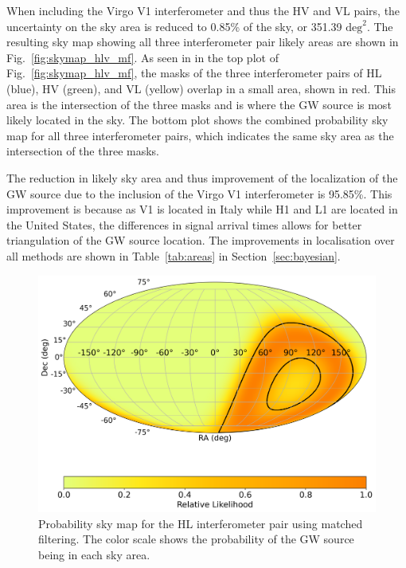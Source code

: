 \documentclass[11pt,a4paper]{article}
\begin{document}
When including the Virgo V1 interferometer and thus the HV and VL pairs, the uncertainty on the sky area is reduced to 0.85\% of the sky, or 351.39 $\mathrm{deg}^2$. The resulting sky map showing all three interferometer pair likely areas are shown in Fig.~\ref{fig:skymap_hlv_mf}. As seen in in the top plot of Fig.~\ref{fig:skymap_hlv_mf}, the masks of the three interferometer pairs of HL (blue), HV (green), and VL (yellow) overlap in a small area, shown in red. This area is the intersection of the three masks and is where the GW source is most likely located in the sky. The bottom plot shows the combined probability sky map for all three interferometer pairs, which indicates the same sky area as the intersection of the three masks.

The reduction in likely sky area and thus improvement of the localization of the GW source due to the inclusion of the Virgo V1 interferometer is 95.85\%. This improvement is because as V1 is located in Italy while H1 and L1 are located in the United States, the differences in signal arrival times allows for better triangulation of the GW source location. The improvements in localisation over all methods are shown in Table~\ref{tab:areas} in Section~\ref{sec:bayesian}.

\begin{figure}
    \includegraphics[width=\columnwidth, keepaspectratio]{../figures/detector_skymap_HL.png}
    \caption{Probability sky map for the HL interferometer pair using matched filtering. The color scale shows the probability of the GW source being in each sky area.}
    \label{fig:skymap_hl_mf}
\end{figure}
\end{document}
